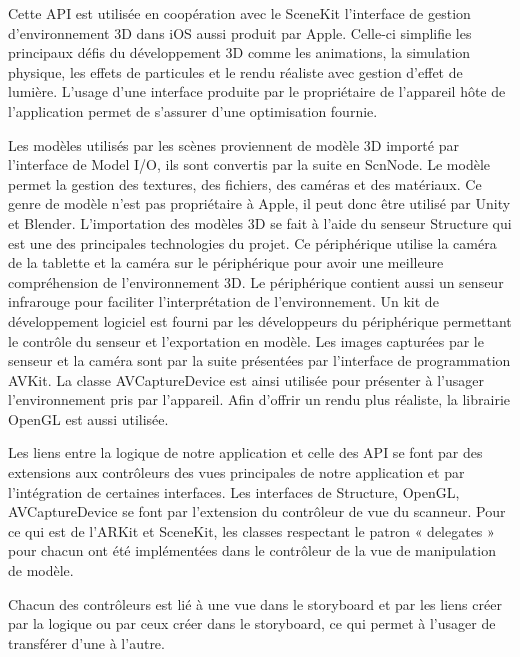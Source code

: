 \documentclass[rapport.tex]{subfiles}
\begin{document}
\par
Cette API est utilisée en coopération avec le SceneKit l’interface de gestion d’environnement 3D dans iOS aussi produit par Apple. Celle-ci simplifie les principaux défis du développement 3D comme les animations, la simulation physique, les effets de particules et le rendu réaliste avec gestion d’effet de lumière. L’usage d’une interface produite par le propriétaire de l’appareil hôte de l’application permet de s’assurer d’une optimisation fournie.\citep*{sceneKitDoc}
\par
Les modèles utilisés par les scènes proviennent de modèle 3D importé par l’interface de Model I/O, ils sont convertis par la suite en ScnNode. Le modèle permet la gestion des textures, des fichiers, des caméras et des matériaux.\citep*{modelIODoc} Ce genre de modèle n’est pas propriétaire à Apple, il peut donc être utilisé par Unity\citep*{unityDoc} et Blender\citep*{blenderForumsRichardMarklew}.
L’importation des modèles 3D se fait à l’aide du senseur Structure qui est une des principales technologies du projet. Ce périphérique utilise la caméra de la tablette et la caméra sur le périphérique pour avoir une meilleure compréhension de l’environnement 3D. Le périphérique contient aussi un senseur infrarouge pour faciliter l’interprétation de l’environnement. Un kit de développement logiciel est fourni par les développeurs du périphérique permettant le contrôle du senseur et l’exportation en modèle.\citep{occipitalsdk} Les images capturées par le senseur et la caméra sont par la suite présentées par l’interface de programmation AVKit. La classe AVCaptureDevice est ainsi utilisée pour présenter à l’usager l’environnement pris par l’appareil.\citep*{aVKitDoc} Afin d’offrir un rendu plus réaliste, la librairie OpenGL est aussi utilisée.\citep*{openGLESDoc}
\par
Les liens entre la logique de notre application et celle des API se font par des extensions aux contrôleurs des vues principales de notre application et par l’intégration de certaines interfaces. Les interfaces de Structure, OpenGL, AVCaptureDevice se font par l’extension du contrôleur de vue du scanneur. Pour ce qui est de l’ARKit et SceneKit, les classes respectant le patron « delegates » pour chacun ont été implémentées dans le contrôleur de la vue de manipulation de modèle.
\par
Chacun des contrôleurs est lié à une vue dans le storyboard et par les liens créer par la logique ou par ceux créer dans le storyboard, ce qui permet à l’usager de transférer d’une à l’autre.
\end{document}
